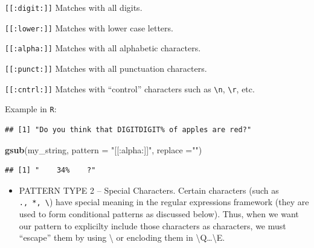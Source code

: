 \documentclass[]{book}
\newenvironment{Shaded}{\begin{snugshade}}{\end{snugshade}}
\newcommand{\KeywordTok}[1]{\textcolor[rgb]{0.13,0.29,0.53}{\textbf{#1}}}
\newcommand{\DataTypeTok}[1]{\textcolor[rgb]{0.13,0.29,0.53}{#1}}
\newcommand{\StringTok}[1]{\textcolor[rgb]{0.31,0.60,0.02}{#1}}
\newcommand{\NormalTok}[1]{#1}
\providecommand{\tightlist}{%
  \setlength{\itemsep}{0pt}\setlength{\parskip}{0pt}}
\theoremstyle{definition}
\theoremstyle{definition}
\theoremstyle{definition}
\theoremstyle{remark}
\begin{document}
\texttt{{[}{[}:digit:{]}{]}} Matches with all digits.

\texttt{{[}{[}:lower:{]}{]}} Matches with lower case letters.

\texttt{{[}{[}:alpha:{]}{]}} Matches with all alphabetic characters.

\texttt{{[}{[}:punct:{]}{]}} Matches with all punctuation characters.

\texttt{{[}{[}:cntrl:{]}{]}} Matches with ``control'' characters such as
\texttt{\textbackslash{}n}, \texttt{\textbackslash{}r}, etc.

Example in \texttt{R}:

\begin{Shaded}
\end{Shaded}

\begin{verbatim}
## [1] "Do you think that DIGITDIGIT% of apples are red?"
\end{verbatim}

\begin{Shaded}
\begin{Highlighting}[]
\KeywordTok{gsub}\NormalTok{(my_string, }\DataTypeTok{pattern =} \StringTok{"[[:alpha:]]"}\NormalTok{, }\DataTypeTok{replace =}\StringTok{""}\NormalTok{)}
\end{Highlighting}
\end{Shaded}

\begin{verbatim}
## [1] "    34%    ?"
\end{verbatim}

\begin{itemize}
\tightlist
\item
  PATTERN TYPE 2 -- Special Characters. Certain characters (such as
  \texttt{.,\ *,\ \textbackslash{}}) have special meaning in the regular
  expressions framework (they are used to form conditional patterns as
  discussed below). Thus, when we want our pattern to explicilty include
  those characters as characters, we must ``escape'' them by using
  \textbackslash{} or encloding them in
  \textbackslash{}Q\ldots{}\textbackslash{}E.
\end{itemize}
\end{document}
